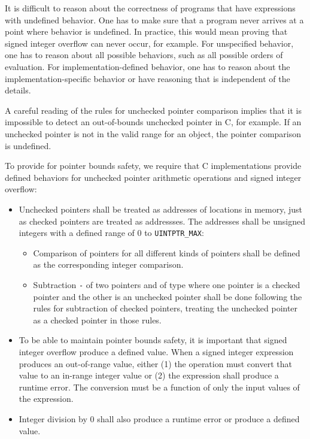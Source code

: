 It is difficult to reason about the correctness of programs that have
expressions with undefined behavior. One has to make sure that a program
never arrives at a point where behavior is undefined. In practice, this
would mean proving that signed integer overflow can never occur, for
example. For unspecified behavior, one has to reason about all possible
behaviors, such as all possible orders of evaluation. For
implementation-defined behavior, one has to reason about the
implementation-specific behavior or have reasoning that is independent
of the details.

A careful reading of the rules for unchecked pointer comparison implies
that it is impossible to detect an out-of-bounds unchecked pointer in C,
for example. If an unchecked pointer  is not in the valid range for an
object, the pointer comparison is undefined.

To provide for pointer bounds safety, we require that C implementations
provide defined behaviors for unchecked pointer arithmetic operations and
signed integer overflow:

\begin{itemize}
\item
  Unchecked pointers shall be treated as addresses of locations in memory,
  just as checked pointers are treated as addressses. The addresses shall
  be unsigned integers with a defined range of 0 to
  \texttt{UINTPTR\_MAX}:

  \begin{itemize}
  \item
    Comparison of pointers for all different kinds of pointers shall be
    defined as the corresponding integer comparison.
  \item
    Subtraction  \texttt{-}  of two pointers  and 
    of type  where one
    pointer is a checked pointer and the other is an unchecked pointer shall
    be done following the rules for subtraction of checked pointers,
    treating the unchecked pointer as a checked pointer in those rules.
  \end{itemize}
\end{itemize}

\begin{itemize}
\item
  To be able to maintain pointer bounds safety, it is important that
  signed integer overflow produce a defined value. When a signed integer
  expression produces an out-of-range value, either (1) the operation
  must convert that value to an in-range integer value or (2) the
  expression shall produce a runtime error. The conversion must be a
  function of only the input values of the expression.
\item
  Integer division by 0 shall also produce a runtime error or produce a
  defined value.
\end{itemize}

